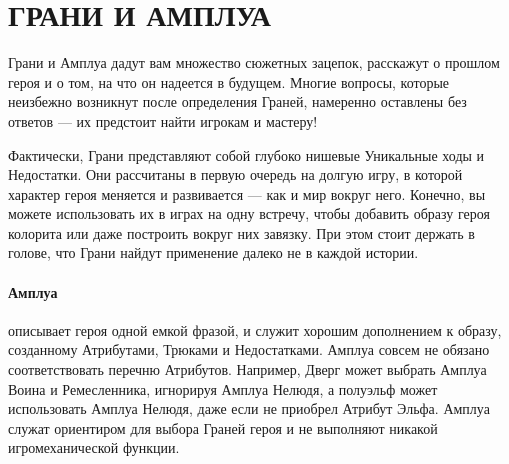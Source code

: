 
\section{ГРАНИ И АМПЛУА}
Грани и Амплуа дадут вам множество сюжетных зацепок, расскажут о прошлом героя и о том, на что он надеется в будущем. Многие вопросы, которые неизбежно возникнут после определения Граней, намеренно оставлены без ответов — их предстоит найти игрокам и мастеру!
\begin{tcolorbox}
Фактически, Грани представляют собой глубоко нишевые Уникальные ходы и Недостатки. Они рассчитаны в первую очередь на долгую игру, в которой характер героя меняется и развивается — как и мир вокруг него. Конечно, вы можете использовать их в играх на одну встречу, чтобы добавить образу героя колорита или даже построить вокруг них завязку. При этом стоит держать в голове, что Грани найдут применение далеко не в каждой истории.
\end{tcolorbox}
\paragraph{Амплуа} описывает героя одной емкой фразой, и служит хорошим дополнением к образу, созданному Атрибутами, Трюками и Недостатками. Амплуа совсем не обязано соответствовать перечню Атрибутов. Например, Дверг может выбрать Амплуа Воина и Ремесленника, игнорируя Амплуа Нелюдя, а полуэльф может использовать Амплуа Нелюдя, даже если не приобрел Атрибут Эльфа. Амплуа служат ориентиром для выбора Граней героя и не выполняют никакой игромеханической функции.
